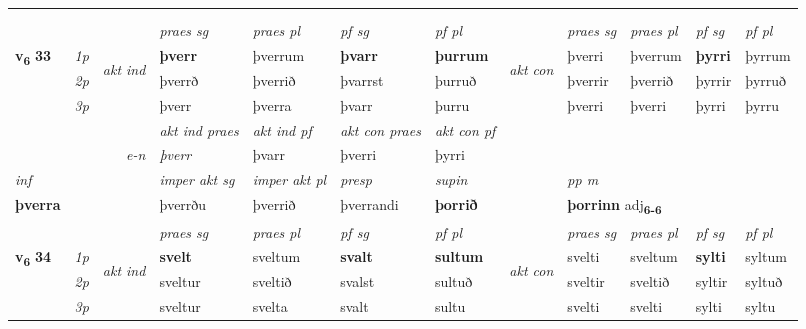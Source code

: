 \begin{longtable}[l]{X>{\footnotesize\itshape}llXXXXlXXXX}
\midrule
   & \\*
  & \\
   \midrule
 & &   & \textit{praes sg}  & \textit{praes pl}    & \textit{ pf sg} & \textit{pf pl} & & \textit{praes sg}  & \textit{praes pl}    & \textit{pf sg} & \textit{pf pl }  \\ \cmidrule{4-7} \cmidrule{9-12}
 \multirow{2}{*}{{{\textbf{v{\textsubscript{6}}} \Large{\textbf{33}}}}}  & 1p & \multirow{3}{*}{\begin{turn}{90}\textit{akt ind}\end{turn}} & \textbf{þverr} & þverrum & \textbf{þvarr} & \textbf{þurrum} & \multirow{3}{*}{\begin{turn}{90}\textit{akt con}\end{turn}} &þverri & þverrum & \textbf{þyrri} & þyrrum\\*
 & 2p &  &  þverrð  & þverrið & þvarrst & þurruð & & þverrir & þverrið & þyrrir & þyrruð \\*
 & 3p &  & þverr & þverra & þvarr & þurru & & þverri & þverri& þyrri & þyrru \\*
\cmidrule{4-7} \cmidrule{9-12}

   && &  \textit{akt ind praes} & \textit{akt ind pf} & \textit{akt con praes} & \textit{akt con pf} \\*
\multicolumn{3}{r}{\textit{e-n}} & þverr & þvarr & þverri & þyrri \\*

\cmidrule{4-7}
   {\textit{inf}} & &  & \textit{imper akt sg} & \textit{imper akt pl}   & \textit{presp} & \textit{supin}  && \textit{pp m} \\*
  {\textbf{þverra}} & && þverrðu  & þverrið   & þverrandi &  \textbf{þorrið}  && \multicolumn{2}{l}{\textbf{þorrinn} adj\textbf{\textsubscript{6-6}}} \\*

\midrule

 & &   & \textit{praes sg}  & \textit{praes pl}    & \textit{ pf sg} & \textit{pf pl} & & \textit{praes sg}  & \textit{praes pl}    & \textit{pf sg} & \textit{pf pl }  \\ \cmidrule{4-7} \cmidrule{9-12}
 \multirow{2}{*}{{{\textbf{v{\textsubscript{6}}} \Large{\textbf{34}}}}}  & 1p & \multirow{3}{*}{\begin{turn}{90}\textit{akt ind}\end{turn}} & \textbf{svelt} & sveltum & \textbf{svalt} & \textbf{sultum} & \multirow{3}{*}{\begin{turn}{90}\textit{akt con}\end{turn}} &svelti & sveltum & \textbf{sylti} & syltum\\*
 & 2p &  &  sveltur  & sveltið & svalst & sultuð & & sveltir & sveltið & syltir & syltuð \\*
 & 3p &  & sveltur & svelta & svalt & sultu & & svelti & svelti& sylti & syltu \\*
\cmidrule{4-7} \cmidrule{9-12}


\end{longtable}

